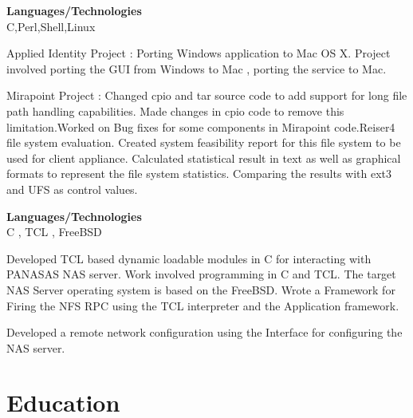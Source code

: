 \documentclass[a4,10pt]{cv4tw}
\begin{document}
{\textbf{Languages/Technologies} \\ C,Perl,Shell,Linux}
	{
	\begin{missions}
		\item Applied Identity Project : Porting Windows application to Mac OS X. Project involved porting the GUI from Windows to Mac , porting the service to Mac.
		\item Mirapoint Project : Changed cpio and tar source code to add support for long file path handling capabilities. Made changes in cpio code to remove this limitation.Worked on Bug fixes for some components in Mirapoint code.Reiser4 file system evaluation. Created system feasibility report for this file system to be used for client appliance. Calculated statistical result in text as well as graphical formats to represent the file system statistics. Comparing the results with ext3 and UFS as control values.
	\end{missions}
}

{\textbf{Languages/Technologies} \\ C , TCL , FreeBSD}
	{
	\begin{missions}
		\item Developed TCL based dynamic loadable modules in C for interacting with PANASAS NAS server. Work involved programming in C and TCL. The target NAS Server operating system is based on the FreeBSD. Wrote a Framework for Firing the NFS RPC using the TCL interpreter and the Application framework.
		\item Developed a remote network configuration using the  Interface for configuring the NAS server.
	\end{missions}
}

\section{Education}

\end{document}
